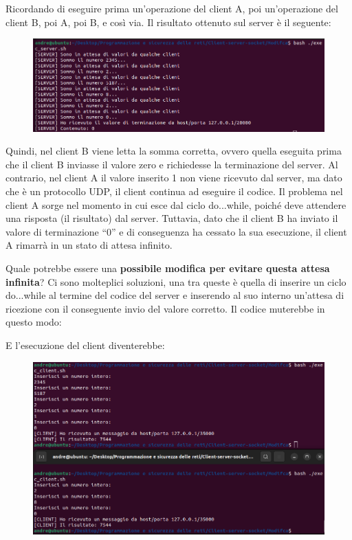 \documentclass[a4paper]{article}
\newcommand{\dquotes}[1]{``#1''}
\begin{document}
	\noindent
	Ricordando di eseguire prima un'operazione del client A, poi un'operazione del client B, poi A, poi B, e così via. Il risultato ottenuto sul server è il seguente:\newpage
	\begin{figure}[!htp]
		\centering
		\includegraphics[width=\textwidth]{img/soluzioni_TCP-UDP/TCP-UDP_6.png}
	\end{figure}

	\noindent
	Quindi, nel client B viene letta la somma corretta, ovvero quella eseguita prima che il client B inviasse il valore zero e richiedesse la terminazione del server. Al contrario, nel client A il valore inserito 1 non viene ricevuto dal server, ma dato che è un protocollo UDP, il client continua ad eseguire il codice. Il problema nel client A sorge nel momento in cui esce dal ciclo \textsf{do...while}, poiché deve attendere una risposta (il risultato) dal server. Tuttavia, dato che il client B ha inviato il valore di terminazione \dquotes{0} e di conseguenza ha cessato la sua esecuzione, il client A rimarrà in un stato di attesa infinito.\newline
	
	\noindent
	Quale potrebbe essere una \textbf{possibile modifica per evitare questa attesa infinita}? Ci sono molteplici soluzioni, una tra queste è quella di inserire un ciclo \textsf{do...while} al termine del codice del server e inserendo al suo interno un'attesa di ricezione con il conseguente invio del valore corretto. Il codice muterebbe in questo modo:
	
	E l'esecuzione del client diventerebbe:
	\begin{figure}[!htp]
		\centering
		\includegraphics[width=\textwidth]{img/soluzioni_TCP-UDP/TCP-UDP_7.png}
	\end{figure}
\end{document}
